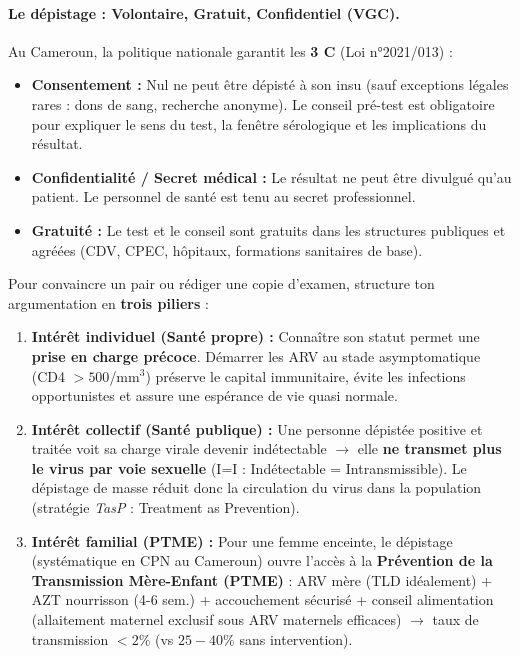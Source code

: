 \documentclass[11pt]{article}
\begin{document}
\paragraph{Le dépistage : Volontaire, Gratuit, Confidentiel (VGC).}
Au Cameroun, la politique nationale garantit les \textbf{3 C} (Loi n°2021/013) :
\begin{itemize}
    \item \textbf{Consentement :} Nul ne peut être dépisté à son insu (sauf exceptions légales rares : dons de sang, recherche anonyme). Le conseil pré-test est obligatoire pour expliquer le sens du test, la fenêtre sérologique et les implications du résultat.
    \item \textbf{Confidentialité / Secret médical :} Le résultat ne peut être divulgué qu'au patient. Le personnel de santé est tenu au secret professionnel.
    \item \textbf{Gratuité :} Le test et le conseil sont gratuits dans les structures publiques et agréées (CDV, CPEC, hôpitaux, formations sanitaires de base).
\end{itemize}

\begin{methode}
Pour convaincre un pair ou rédiger une copie d'examen, structure ton argumentation en \textbf{trois piliers} :
\begin{enumerate}
    \item \textbf{Intérêt individuel (Santé propre) :} Connaître son statut permet une \textbf{prise en charge précoce}. Démarrer les ARV au stade asymptomatique (CD4 $> 500$/mm$^3$) préserve le capital immunitaire, évite les infections opportunistes et assure une espérance de vie quasi normale.
    \item \textbf{Intérêt collectif (Santé publique) :} Une personne dépistée positive et traitée voit sa charge virale devenir indétectable $\rightarrow$ elle \textbf{ne transmet plus le virus par voie sexuelle} (I=I : Indétectable = Intransmissible). Le dépistage de masse réduit donc la circulation du virus dans la population (stratégie \emph{TasP} : Treatment as Prevention).
    \item \textbf{Intérêt familial (PTME) :} Pour une femme enceinte, le dépistage (systématique en CPN au Cameroun) ouvre l'accès à la \textbf{Prévention de la Transmission Mère-Enfant (PTME)} : ARV mère (TLD idéalement) + AZT nourrisson (4-6 sem.) + accouchement sécurisé + conseil alimentation (allaitement maternel exclusif sous ARV maternels efficaces) $\rightarrow$ taux de transmission $< 2\%$ (vs $25-40\%$ sans intervention).
\end{enumerate}
\end{methode}
\end{document}
